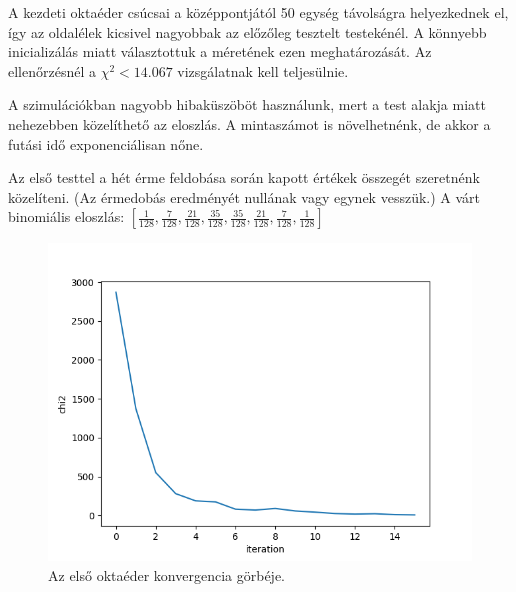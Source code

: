 \newpage


A kezdeti oktaéder csúcsai a középpontjától 50 egység távolságra helyezkednek el, így az oldalélek kicsivel nagyobbak az előzőleg tesztelt testekénél.
A könnyebb inicializálás miatt választottuk a méretének ezen meghatározását.
Az ellenőrzésnél a $\chi^2 < 14.067$ vizsgálatnak kell teljesülnie.

\begin{remark}
A szimulációkban nagyobb hibaküszöböt használunk, mert a test alakja miatt nehezebben közelíthető az eloszlás.
A mintaszámot is növelhetnénk, de akkor a futási idő exponenciálisan nőne.
\end{remark}

Az első testtel a hét érme feldobása során kapott értékek összegét szeretnénk közelíteni.
(Az érmedobás eredményét nullának vagy egynek vesszük.)
A várt binomiális eloszlás: $[\frac{1}{128}, \frac{7}{128}, \frac{21}{128}, \frac{35}{128}, \frac{35}{128}, \frac{21}{128}, \frac{7}{128}, \frac{1}{128}]$

\begin{figure}[h!]
	\centering
	\includegraphics[scale=0.7]{images/octahedron_01.png}
	\caption{Az első oktaéder konvergencia görbéje.}
	\label{fig:octa01}
\end{figure}

